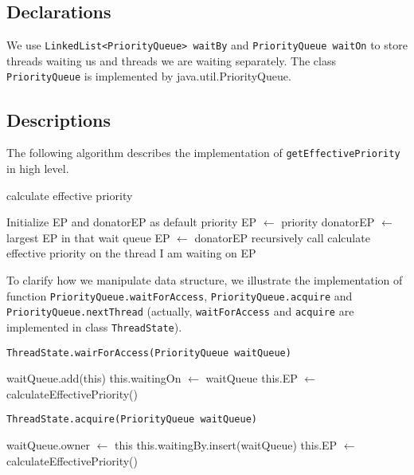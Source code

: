 \documentclass{article}
\begin{document}
\begin{spacing}{1.1}
\subsection{Declarations}

We use \texttt{LinkedList<PriorityQueue> waitBy} and \texttt{PriorityQueue waitOn} to store threads waiting us and threads we are waiting separately. The class \texttt{PriorityQueue} is implemented by java.util.PriorityQueue.

\subsection{Descriptions}

The following algorithm describes the implementation of \texttt{getEffectivePriority} in high level.

\begin{algorithm}
  \caption{calculate effective priority}
\begin{algorithmic}[1]
  \STATE Initialize EP and donatorEP as default priority
  \STATE EP $\leftarrow$ priority
  \STATE donatorEP $\leftarrow$ largest EP in that wait queue
    \STATE EP $\leftarrow$ donatorEP
  \ENDIF
\ENDFOR
\STATE recursively call calculate effective priority on the thread I am waiting on
\RETURN EP
\end{algorithmic}
\end{algorithm}

To clarify how we manipulate data structure, we illustrate the implementation of function \linebreak \texttt{PriorityQueue.waitForAccess}, \texttt{PriorityQueue.acquire} and \texttt{PriorityQueue.nextThread} (actually, \linebreak \texttt{waitForAccess} and \texttt{acquire} are implemented in class \texttt{ThreadState}).

\begin{algorithm}
  \caption{\texttt{ThreadState.wairForAccess(PriorityQueue waitQueue)}}
\begin{algorithmic}[1]
  \STATE waitQueue.add(this)  
  \STATE this.waitingOn $\leftarrow$ waitQueue  
  \STATE this.EP $\leftarrow$ calculateEffectivePriority()  
\RETURN
\end{algorithmic}
\end{algorithm}

\begin{algorithm}
  \caption{\texttt{ThreadState.acquire(PriorityQueue waitQueue)}}
\begin{algorithmic}[1]
  \STATE waitQueue.owner $\leftarrow$ this
  \STATE this.waitingBy.insert(waitQueue)
  \STATE this.EP $\leftarrow$ calculateEffectivePriority()  
\RETURN
\end{algorithmic}
\end{algorithm}


\end{spacing}
\end{document}
